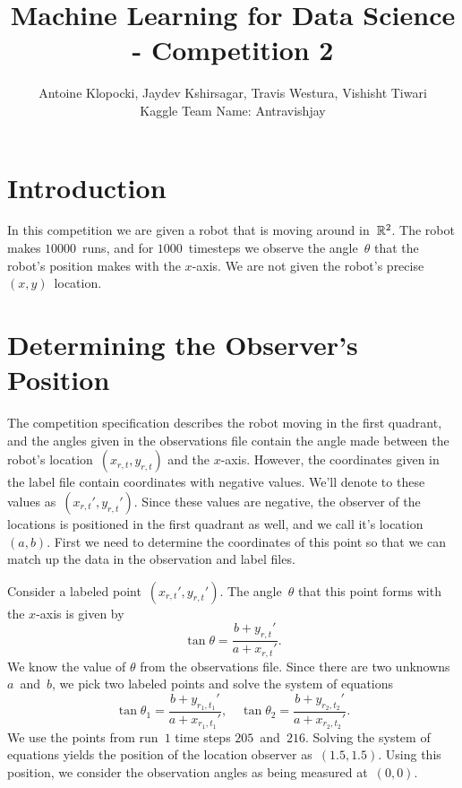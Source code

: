 \documentclass[twoside]{article}
\title{Machine Learning for Data Science - Competition 2}
\author{Antoine Klopocki, Jaydev Kshirsagar, Travis Westura, Vishisht Tiwari\\Kaggle Team Name: Antravishjay}
\date{\vspace{-5ex}} %
\begin{document}
\maketitle
\thispagestyle{empty}

\section{Introduction}\label{sec:introduction}

In this competition we are given a robot that is moving around in~$\mathbb{R}^2$.
The robot makes $10000$~runs, and for $1000$~timesteps we observe the angle~$\theta$ that the robot's position makes with the $x$-axis.
We are not given the robot's precise ${(x, y)}$~location.

\section{Determining the Observer's Position}\label{sec:determ-observ-posit}

The competition specification describes the robot moving in the first quadrant, and the angles given in the observations file contain the angle made between the robot's location~${(x_{r, t}, y_{r, t})}$ and the $x$-axis.
However, the coordinates given in the label file contain coordinates with negative values.
We'll denote to these values as~${(x_{r, t}', y_{r, t}')}$.
Since these values are negative, the observer of the locations is positioned in the first quadrant as well, and we call it's location~${(a, b)}$.
First we need to determine the coordinates of this point so that we can match up the data in the observation and label files.

Consider a labeled point~${(x_{r, t}', y_{r, t}')}$.
The angle~$\theta$ that this point forms with the $x$-axis is given by
\begin{equation*}
  \tan\theta = \frac{b + y_{r, t}'}{a + x_{r, t}'}.
\end{equation*}
We know the value of $\theta$ from the observations file.
Since there are two unknowns $a$~and~$b$, we pick two labeled points and solve the system of equations
\begin{equation*}
  \tan\theta_1 = \frac{b + y_{r_1, t_1}'}{a + x_{r_1, t_1}'}, \quad \tan\theta_2 = \frac{b + y_{r_2, t_2}'}{a + x_{r_2, t_2}'}.
\end{equation*}
We use the points from run~$1$ time steps $205$~and~$216$.
Solving the system of equations yields the position of the location observer as~$(1.5, 1.5)$.
Using this position, we consider the observation angles as being measured at~$(0, 0)$.
\end{document}
